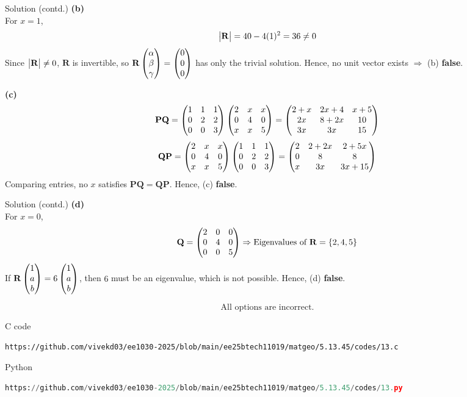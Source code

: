 \documentclass{beamer}
\renewcommand{\vec}[1]{\mathbf{#1}}
\begin{document}
\begin{frame}{Solution (contd.)}
\textbf{(b)}\\[-2mm]
For $x=1$,
\[
\mydet{\vec{R}} = 40 - 4(1)^2 = 36 \neq 0
\]
Since $\mydet{\vec{R}} \neq 0$, $\vec{R}$ is invertible,  
so $\vec{R}\myvec{\alpha\\ \beta\\ \gamma} = \myvec{0\\ 0\\ 0}$  
has only the trivial solution.  
Hence, no unit vector exists $\Rightarrow$ (b) \textbf{false}.

\textbf{(c)}\\[-2mm]
\[
\vec{P}\vec{Q}
=\myvec{1 & 1 & 1\\ 0 & 2 & 2\\ 0 & 0 & 3}
\myvec{2 & x & x\\ 0 & 4 & 0\\ x & x & 5}
=\myvec{2+x & 2x+4 & x+5\\ 2x & 8+2x & 10\\ 3x & 3x & 15}
\]
\[
\vec{Q}\vec{P}
=\myvec{2 & x & x\\ 0 & 4 & 0\\ x & x & 5}
\myvec{1 & 1 & 1\\ 0 & 2 & 2\\ 0 & 0 & 3}
=\myvec{2 & 2+2x & 2+5x\\ 0 & 8 & 8\\ x & 3x & 3x+15}
\]
Comparing entries, no $x$ satisfies $\vec{P}\vec{Q}=\vec{Q}\vec{P}$.  
Hence, (c) \textbf{false}.
\end{frame}

\begin{frame}{Solution (contd.)}
\textbf{(d)}\\[-2mm]
For $x=0$,
\[
\vec{Q}=\myvec{2 & 0 & 0\\ 0 & 4 & 0\\ 0 & 0 & 5}
\Rightarrow \text{Eigenvalues of }\vec{R}=\{2,4,5\}
\]
If $\vec{R}\myvec{1\\ a\\ b}=6\myvec{1\\ a\\ b}$,  
then $6$ must be an eigenvalue, which is not possible.  
Hence, (d) \textbf{false}.

\[
\boxed{\text{All options are incorrect.}}
\]
\end{frame}

\begin{frame}[fragile]{C code}
\begin{lstlisting}
https://github.com/vivekd03/ee1030-2025/blob/main/ee25btech11019/matgeo/5.13.45/codes/13.c
\end{lstlisting}
\end{frame}
\begin{frame}[fragile]{Python}
\begin{lstlisting}[language=Python]
https://github.com/vivekd03/ee1030-2025/blob/main/ee25btech11019/matgeo/5.13.45/codes/13.py
\end{lstlisting}
\end{frame}
\end{document}
